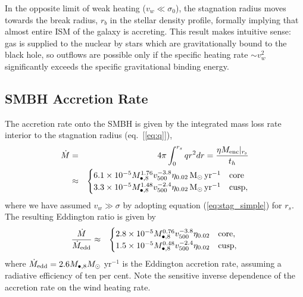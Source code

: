 \documentclass[usenatbib,fleqn]{mn2e}
\newcommand{\rb}{r_b}
\newcommand{\Menc}{M_{\rm enc}}
\newcommand{\Mbheight}{M_{\bullet,8}}
\newcommand{\pyear}{{\rm yr}^{-1}}
\renewcommand{\th}{t_h}
\begin{document}
In the opposite limit of weak heating ($v_{w} \ll \sigma_0$), the
stagnation radius moves towards the break radius, $\rb$ in the stellar
density profile, formally implying that almost entire ISM of the
galaxy is accreting.  This result makes intuitive sense: gas is
supplied to the nuclear by stars which are gravitationally bound to
the black hole, so outflows are possible only if the specific heating
rate $\sim v_{w}^{2}$ significantly exceeds the specific gravitational
binding energy.


\subsection{SMBH Accretion Rate}

The accretion rate onto the SMBH is given by the integrated mass loss rate interior to the stagnation radius (eq.~[\ref{eq:q}]), 
\begin{eqnarray}
  \dot{M} &=& 4\pi \int_{0}^{r_{s}}q r^{2}dr = \frac{\eta \Menc|_{r_{\rm s}}}{\th} \nonumber \\
&\approx&
  \begin{cases}
    6.1 \times 10^{-5} M_{\bullet,8}^{1.76}
    v_{500}^{-3.8}  \eta_{0.02} \Msun \, \pyear& \text{core} \\
    3.3 \times 10^{-5} M_{\bullet,8}^{1.48} 
    v_{500}^{-2.4}  \eta_{0.02} \Msun \, \pyear  & \text{cusp}, 
  \end{cases}
  \label{eq:mdot_analytic}
\end{eqnarray}
where we have assumed $v_{w} \gg \sigma$ by adopting equation (\ref{eq:stag_simple}) for $r_s$.  The resulting Eddington ratio is given by 
\begin{eqnarray}
\frac{\dot{M}}{\dot{M}_{\rm edd}} &\approx&
  \begin{cases}
    2.8 \times 10^{-5} M_{\bullet,8}^{0.76}
    v_{500}^{-3.8}  \eta_{0.02}   & \text{core}, \\
    1.5 \times 10^{-5} \Mbheight^{0.48} 
    v_{500}^{-2.4}  \eta_{0.02}   & \text{cusp}, 
  \end{cases}
  \label{eq:eddr_analytic}
\end{eqnarray}
where $\dot{M}_{\rm edd} = 2.6M_{\bullet,8}M_{\odot}$ yr$^{-1}$  is the Eddington accretion rate, assuming a radiative efficiency of ten per cent.  Note the sensitive inverse dependence of the accretion rate on the wind heating rate.  
\end{document}
